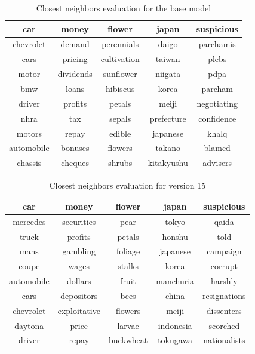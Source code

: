 \begin{table}[!ht]
\centering
\begin{tabular}{|c|c|c|c|c|}
\hline
\rowcolor[HTML]{330001} 
{\color[HTML]{FFFFFF} car} & {\color[HTML]{FFFFFF} money} & {\color[HTML]{FFFFFF} flower} & {\color[HTML]{FFFFFF} japan} & {\color[HTML]{FFFFFF} suspicious} \\ \hline \rowcolor[HTML]{E2EFDA} 
chevrolet & demand & perennials  & daigo & parchamis \\ \hline
cars & pricing & cultivation & taiwan & plebs  \\ \hline \rowcolor[HTML]{E2EFDA} 
motor & dividends  & sunflower & niigata & pdpa   \\ \hline
bmw & loans & hibiscus & korea & parcham \\ \hline \rowcolor[HTML]{E2EFDA} 
driver & profits & petals & meiji & negotiating \\ \hline
nhra & tax & sepals & prefecture & confidence \\ \hline \rowcolor[HTML]{E2EFDA} 
motors & repay & edible & japanese & khalq  \\ \hline
automobile & bonuses & flowers & takano & blamed \\ \hline \rowcolor[HTML]{E2EFDA} 
chassis  & cheques & shrubs & kitakyushu & advisers \\ \hline
\end{tabular}
\caption{Closest neighbors evaluation for the base model}
\label{tab:base-neighbors}
\end{table}

\begin{table}[!ht]
\centering
\begin{tabular}{|c|c|c|c|c|}
\hline
\rowcolor[HTML]{330001} 
{\color[HTML]{FFFFFF} car} & {\color[HTML]{FFFFFF} money} & {\color[HTML]{FFFFFF} flower} & {\color[HTML]{FFFFFF} japan} & {\color[HTML]{FFFFFF} suspicious} \\ \hline \rowcolor[HTML]{E2EFDA} 
mercedes & securities & pear & tokyo & qaida  \\ \hline
truck & profits & petals & honshu & told   \\ \hline \rowcolor[HTML]{E2EFDA} 
mans & gambling & foliage & japanese & campaign \\ \hline
coupe & wages & stalks & korea & corrupt \\ \hline \rowcolor[HTML]{E2EFDA} 
automobile & dollars & fruit & manchuria  & harshly \\ \hline 
cars & depositors & bees & china & resignations \\ \hline \rowcolor[HTML]{E2EFDA} 
chevrolet & exploitative & flowers & meiji & dissenters \\ \hline
daytona  & price & larvae & indonesia  & scorched \\ \hline \rowcolor[HTML]{E2EFDA} 
driver & repay & buckwheat & tokugawa & nationalists \\ \hline 
\end{tabular}
\caption{Closest neighbors evaluation for version 15}
\label{tab:v15-neighbors}
\end{table}

